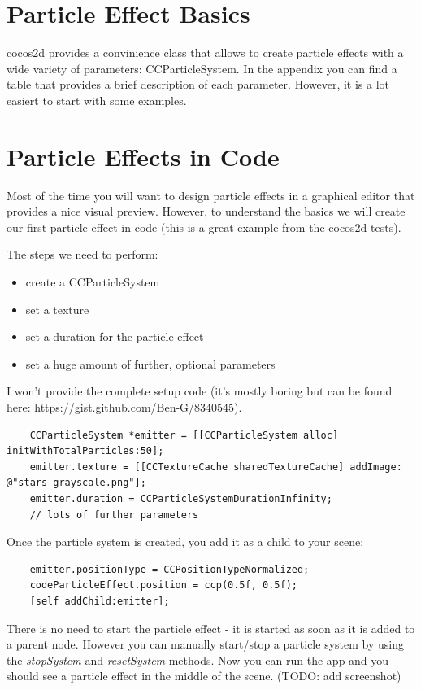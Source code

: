 \documentclass{scrreprt}
\newcommand{\cocos}{cocos2d}
\begin{document}
\section{Particle Effect Basics}
\cocos{} provides a convinience class that allows to create particle effects
with a wide variety of parameters: CCParticleSystem.
In the appendix you can find a table that provides a brief description of each
parameter. However, it is a lot easiert to start with some examples.
\section{Particle Effects in Code}
Most of the time you will want to design particle effects in a graphical editor
that provides a nice visual preview. However, to understand the basics we will
create our first particle effect in code (this is a great example from 
the cocos2d tests).

The steps we need to perform:
 \begin{itemize}
   \item create a CCParticleSystem
   \item set a texture
   \item set a duration for the particle effect
   \item set a huge amount of further, optional parameters
 \end{itemize}
I won't provide the complete setup code (it's mostly boring but can be found
here: https://gist.github.com/Ben-G/8340545).
\begin{lstlisting}
    CCParticleSystem *emitter = [[CCParticleSystem alloc] initWithTotalParticles:50];
    emitter.texture = [[CCTextureCache sharedTextureCache] addImage: @"stars-grayscale.png"];
	emitter.duration = CCParticleSystemDurationInfinity;
    // lots of further parameters
\end{lstlisting}
Once the particle system is created, you add it as a child to your scene:
\begin{lstlisting}
    emitter.positionType = CCPositionTypeNormalized;
    codeParticleEffect.position = ccp(0.5f, 0.5f);
    [self addChild:emitter];
\end{lstlisting}
There is no need to start the particle effect - it is started as soon as it is
added to a parent node. However you can manually start/stop a particle system by
using the \textit{stopSystem} and \textit{resetSystem} methods. Now you can run
the app and you should see a particle effect in the middle of the scene. (TODO: add screenshot)
\end{document}
